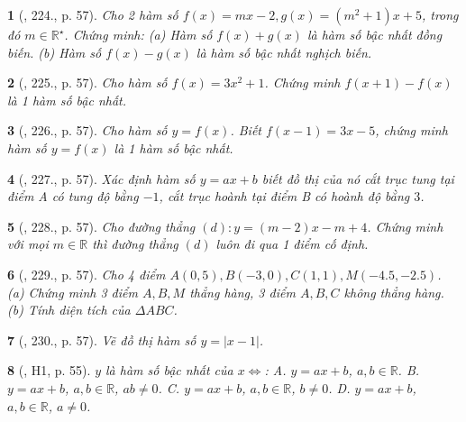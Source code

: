 \documentclass{article}
\newtheorem{baitoan}{}
\begin{document}
\begin{baitoan}[\cite{Tuyen_Toan_8}, 224., p. 57]
	Cho 2 hàm số $f(x) = mx - 2,g(x) = (m^2 + 1)x + 5$, trong đó $m\in\mathbb{R}^\star$. Chứng minh: (a) Hàm số $f(x) + g(x)$ là hàm số bậc nhất đồng biến. (b) Hàm số $f(x) - g(x)$ là hàm số bậc nhất nghịch biến.
\end{baitoan}

\begin{baitoan}[\cite{Tuyen_Toan_8}, 225., p. 57]
	Cho hàm số $f(x) = 3x^2 + 1$. Chứng minh $f(x + 1) - f(x)$ là 1 hàm số bậc nhất.
\end{baitoan}

\begin{baitoan}[\cite{Tuyen_Toan_8}, 226., p. 57]
	Cho hàm số $y = f(x)$. Biết $f(x - 1) = 3x - 5$, chứng minh hàm số $y = f(x)$ là 1 hàm số bậc nhất.
\end{baitoan}

\begin{baitoan}[\cite{Tuyen_Toan_8}, 227., p. 57]
	Xác định hàm số $y = ax + b$ biết đồ thị của nó cắt trục tung tại điểm A có tung độ bằng $-1$, cắt trục hoành tại điểm B có hoành độ bằng $3$.
\end{baitoan}

\begin{baitoan}[\cite{Tuyen_Toan_8}, 228., p. 57]
	Cho đường thẳng $(d):y = (m - 2)x - m + 4$. Chứng minh với mọi $m\in\mathbb{R}$ thì đường thẳng $(d)$ luôn đi qua 1 điểm cố định.
\end{baitoan}

\begin{baitoan}[\cite{Tuyen_Toan_8}, 229., p. 57]
	Cho 4 điểm $A(0,5),B(-3,0),C(1,1),M(-4.5,-2.5)$. (a) Chứng minh 3 điểm $A,B,M$ thẳng hàng, 3 điểm $A,B,C$ không thẳng hàng. (b) Tính diện tích của $\Delta ABC$.
\end{baitoan}

\begin{baitoan}[\cite{Tuyen_Toan_8}, 230., p. 57]
	Vẽ đồ thị hàm số $y = |x - 1|$.
\end{baitoan}

\begin{baitoan}[\cite{Binh_boi_duong_Toan_9_tap_1}, H1, p. 55]
	$y$ là hàm số bậc nhất của $x\Leftrightarrow$: {\sf A.} $y = ax + b$, $a,b\in\mathbb{R}$. {\sf B.} $y = ax + b$, $a,b\in\mathbb{R}$, $ab\ne0$. {\sf C.} $y = ax + b$, $a,b\in\mathbb{R}$, $b\ne0$. {\sf D.} $y = ax + b$, $a,b\in\mathbb{R}$, $a\ne0$.
\end{baitoan}
\end{document}
